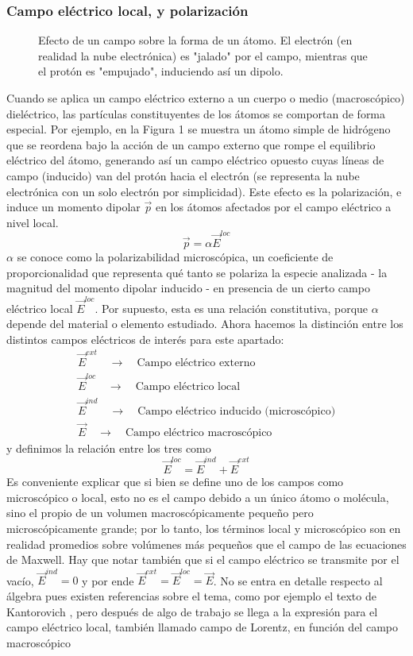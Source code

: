 \documentclass[12pt, notitlepage]{article}
\begin{document}
\subsubsection{Campo eléctrico local, y polarización}
\begin{figure}[H]
\centering

\caption{Efecto de un campo sobre la forma de un átomo. El electrón (en realidad la nube electrónica) es "jalado" por el campo, mientras que el protón es "empujado", induciendo así un dipolo.}
\end{figure}
Cuando se aplica un campo eléctrico externo a un cuerpo o medio (macroscópico) dieléctrico, las partículas constituyentes de los átomos se comportan de forma especial. Por ejemplo, en la Figura 1 se muestra un átomo simple de hidrógeno que se reordena bajo la acción de un campo externo que rompe el equilibrio eléctrico del átomo, generando así un campo eléctrico opuesto cuyas líneas de campo (inducido) van del protón hacia el electrón (se representa la nube electrónica con un solo electrón por simplicidad). Este efecto es la polarización, e induce un momento dipolar $\vec{p}$ en los átomos afectados por el campo eléctrico a nivel local.
\begin{equation}
\vec{p} = \alpha\vec{E}^{loc}
\end{equation}
$\alpha$ se conoce como la polarizabilidad microscópica, un coeficiente de proporcionalidad que representa qué tanto se polariza la especie analizada - la magnitud del momento dipolar inducido - en presencia de un cierto campo eléctrico local $\vec{E}^{loc}$. Por supuesto, esta es una relación constitutiva, porque $\alpha$ depende del material o elemento estudiado. Ahora hacemos la distinción entre los distintos campos eléctricos de interés para este apartado:
\begin{gather*}
\vec{E}^{ext} \quad \longrightarrow \quad \text{Campo eléctrico externo}\\
\vec{E}^{loc} \quad \longrightarrow \quad \text{Campo eléctrico local}\\
\vec{E}^{ind} \quad \longrightarrow \quad \text{Campo eléctrico inducido (microscópico)}\\
\vec{E} \quad \longrightarrow \quad \text{Campo eléctrico macroscópico}
\end{gather*}
y definimos la relación entre los tres como
\begin{equation}
\vec{E}^{loc} = \vec{E}^{ind} + \vec{E}^{ext}
\end{equation}
Es conveniente explicar que si bien se define uno de los campos como microscópico o local, esto no es el campo debido a un único átomo o molécula, sino el propio de un volumen macroscópicamente pequeño pero microscópicamente grande; por lo tanto, los términos local y microscópico son en realidad promedios sobre volúmenes más pequeños que el campo de las ecuaciones de Maxwell. Hay que notar también que si el campo eléctrico se transmite por el vacío, $\vec{E}^{ind} = 0$ y por ende $\vec{E}^{ext} = \vec{E}^{loc} = \vec{E}$. No se entra en detalle respecto al álgebra pues existen referencias sobre el tema, como por ejemplo el texto de Kantorovich \cite{Kantorovich}, pero después de algo de trabajo se llega a la expresión para el campo eléctrico local, también llamado campo de Lorentz, en función del campo macroscópico
\end{document}
